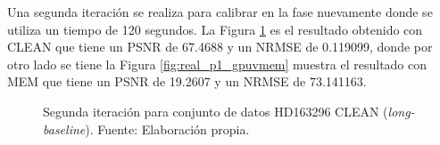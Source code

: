 Una segunda iteración se realiza para calibrar en la fase nuevamente donde se utiliza un tiempo de 120 segundos. La Figura \ref{fig:real_p1_clean} es el resultado obtenido con CLEAN que tiene un PSNR de 67.4688 y un NRMSE de 0.119099, donde por otro lado se tiene la Figura \ref{fig:real_p1_gpuvmem} muestra el resultado con MEM que tiene un PSNR de 19.2607 y un NRMSE de 73.141163.

\begin{figure}[!ht]
 \centering
    \vspace{0.3cm}
 \caption[Segunda iteración para conjunto de datos HD163296 CLEAN (\textit{long-baseline})]{Segunda iteración para conjunto de datos HD163296 CLEAN (\textit{long-baseline}). Fuente: Elaboración propia.}
 \label{fig:real_p1_clean}
\end{figure}

